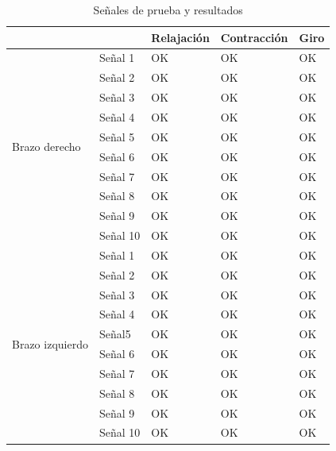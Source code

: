\renewcommand\tablename{Tabla}
\begin{table}[H]
\centering
\begin{tabular}{|l|l|l|l|l|}
\hline
\multicolumn{2}{|l|}{}                       & Relajación & Contracción & Giro \\ \hline
\multirow{10}{*}{Brazo derecho}   & Señal 1  & OK         & OK          & OK   \\ \cline{2-5} 
                                  & Señal 2  & OK         & OK          & OK   \\ \cline{2-5} 
                                  & Señal 3  & OK         & OK          & OK   \\ \cline{2-5} 
                                  & Señal 4  & OK         & OK          & OK   \\ \cline{2-5} 
                                  & Señal 5  & OK         & OK          & OK   \\ \cline{2-5} 
                                  & Señal 6  & OK         & OK          & OK   \\ \cline{2-5} 
                                  & Señal 7  & OK         & OK          & OK   \\ \cline{2-5} 
                                  & Señal 8  & OK         & OK          & OK   \\ \cline{2-5} 
                                  & Señal 9  & OK         & OK          & OK   \\ \cline{2-5} 
                                  & Señal 10 & OK         & OK          & OK   \\ \hline
\multirow{10}{*}{Brazo izquierdo} & Señal 1  & OK         & OK          & OK   \\ \cline{2-5} 
                                  & Señal 2  & OK         & OK          & OK   \\ \cline{2-5} 
                                  & Señal 3  & OK         & OK          & OK   \\ \cline{2-5} 
                                  & Señal 4  & OK         & OK          & OK   \\ \cline{2-5} 
                                  & Señal5   & OK         & OK          & OK   \\ \cline{2-5} 
                                  & Señal 6  & OK         & OK          & OK   \\ \cline{2-5} 
                                  & Señal 7  & OK         & OK          & OK   \\ \cline{2-5} 
                                  & Señal 8  & OK         & OK          & OK   \\ \cline{2-5} 
                                  & Señal 9  & OK         & OK          & OK   \\ \cline{2-5} 
                                  & Señal 10 & OK         & OK          & OK   \\ \hline
\end{tabular}
	\caption{Señales de prueba y resultados}
	\label{tabla:tabla1}
\end{table}
\newpage

